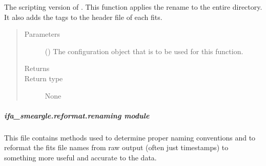 \documentclass[letterpaper,10pt,english]{sphinxmanual}
\begin{document}
\begin{fulllineitems}
\label{\detokenize{docstrings/ifa_smeargle.reformat.collapse:ifa_smeargle.reformat.collapse.script_collapse_by_average_endpoints_per_second}}
The scripting version of
.
This function applies the rename to the entire directory. It
also adds the tags to the header file of each fits.
\begin{quote}\begin{description}
\item[{Parameters}] \leavevmode
{} () \textendash{} The configuration object that is to be used for this
function.

\item[{Returns}] \leavevmode


\item[{Return type}] \leavevmode
None

\end{description}\end{quote}

\end{fulllineitems}



\subparagraph{ifa\_smeargle.reformat.renaming module}
\label{\detokenize{docstrings/ifa_smeargle.reformat.renaming:module-ifa_smeargle.reformat.renaming}}\label{\detokenize{docstrings/ifa_smeargle.reformat.renaming:ifa-smeargle-reformat-renaming-module}}\label{\detokenize{docstrings/ifa_smeargle.reformat.renaming::doc}}
This file contains methods used to determine proper naming
conventions and to reformat the fits file names from raw output
(often just timestamps) to something more useful and accurate to the
data.
\end{document}
